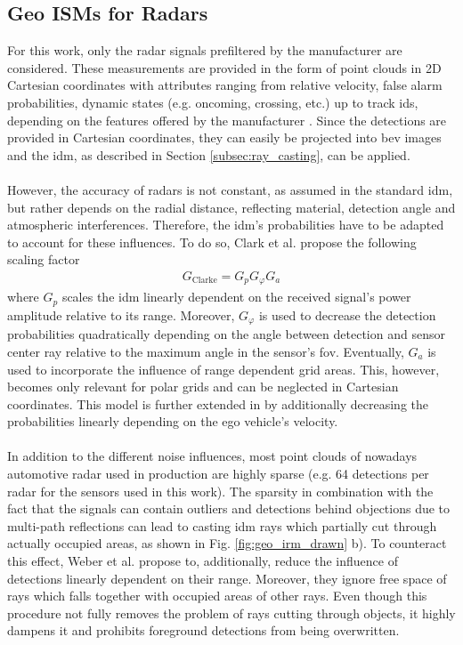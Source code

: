 \subsection{Geo ISMs for Radars}
\label{subsec:geo_ism_radar}
For this work, only the radar signals prefiltered by the manufacturer are considered. These measurements are provided in the form of point clouds in 2D Cartesian coordinates with attributes ranging from relative velocity, false alarm probabilities, dynamic states (e.g. oncoming, crossing, etc.) up to track ids, depending on the features offered by the manufacturer \cite{caesar2020nuscenes}. Since the detections are provided in Cartesian coordinates, they can easily be projected into \gls{bev} images and the \gls{idm}, as described in Section \ref{subsec:ray_casting}, can be applied.
\\\\
However, the accuracy of radars is not constant, as assumed in the standard \gls{idm}, but rather depends on the radial distance, reflecting material, detection angle and atmospheric interferences. Therefore, the \gls{idm}'s probabilities have to be adapted to account for these influences. To do so, Clark et al. \cite{clarke2012sensor} propose the following scaling factor
\begin{align}
	\label{eq:clarke_scaling}
	G_{\text{Clarke}} = G_p G_\varphi G_a
\end{align}
where $G_p$ scales the \gls{idm} linearly dependent on the received signal's power amplitude relative to its range. Moreover, $G_\varphi$ is used to decrease the detection probabilities quadratically depending on the angle between detection and sensor center ray relative to the maximum angle in the sensor's \gls{fov}. Eventually, $G_a$ is used to incorporate the influence of range dependent grid areas. This, however, becomes only relevant for polar grids and can be neglected in Cartesian coordinates. This model is further extended in \cite{prophet2018adaptions} by additionally decreasing the probabilities linearly depending on the ego vehicle's velocity.
\\\\
In addition to the different noise influences, most point clouds of nowadays automotive radar used in production are highly sparse (e.g. 64 detections per radar for the sensors used in this work). The sparsity in combination with the fact that the signals can contain outliers and detections behind objections due to multi-path reflections can lead to casting \gls{idm} rays which partially cut through actually occupied areas, as shown in Fig. \ref{fig:geo_irm_drawn} b). To counteract this effect, Weber et al. \cite{werber2015automotive} propose to, additionally, reduce the influence of detections linearly dependent on their range. Moreover, they ignore free space of rays which falls together with occupied areas of other rays. Even though this procedure not fully removes the problem of rays cutting through objects, it highly dampens it and prohibits foreground detections from being overwritten.
